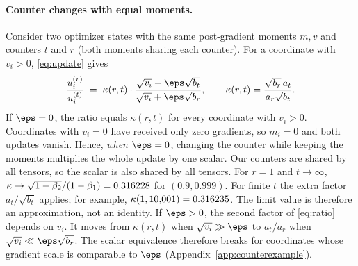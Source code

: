 \paragraph{Counter changes with equal moments.}
Consider two optimizer states with the same post-gradient moments $m,v$ and counters $t$ and $r$ (both
moments sharing each counter). For a coordinate with $v_i>0$, \eqref{eq:update} gives
\begin{equation}
\frac{u^{(r)}_i}{u^{(t)}_i}
 \;=\; \kappa(r,t)\cdot\frac{\sqrt{v_i}+\eps\sqrt{b_t}}{\sqrt{v_i}+\eps\sqrt{b_r}},
\qquad
\kappa(r,t)=\frac{\sqrt{b_r}\,a_t}{a_r\sqrt{b_t}} .
\label{eq:ratio}
\end{equation}
If $\eps=0$, the ratio equals $\kappa(r,t)$ for every coordinate with $v_i>0$. Coordinates with
$v_i=0$ have received only zero gradients, so $m_i=0$ and both updates vanish. Hence, \emph{when
$\eps=0$}, changing the counter while keeping the moments multiplies the whole update by one scalar.
Our counters are shared by all tensors, so the scalar is also shared by all tensors. For $r=1$ and
$t\to\infty$, $\kappa\to\sqrt{1-\beta_2}/(1-\beta_1)=0.316228$ for $(0.9,0.999)$. For finite $t$ the
extra factor $a_t/\sqrt{b_t}$ applies; for example, $\kappa(1,10{,}001)=0.316235$. The limit value is
therefore an approximation, not an identity.
If $\eps>0$, the second factor of \eqref{eq:ratio} depends on $v_i$. It moves from $\kappa(r,t)$
when $\sqrt{v_i}\gg\eps$ to $a_t/a_r$ when $\sqrt{v_i}\ll\eps\sqrt{b_r}$. The scalar equivalence
therefore breaks for coordinates whose gradient scale is comparable to $\eps$
(Appendix~\ref{app:counterexample}).

